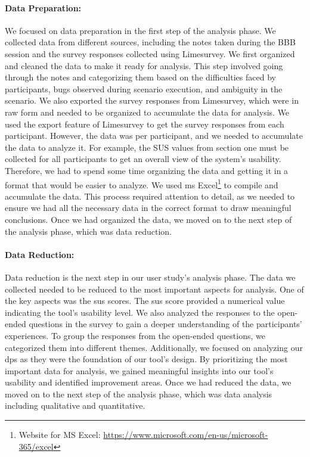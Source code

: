 \paragraph{Data Preparation:}
We focused on data preparation in the first step of the analysis phase. 
We collected data from different sources, including the notes taken during the BBB session and the survey responses collected using Limesurvey. 
We first organized and cleaned the data to make it ready for analysis. 
This step involved going through the notes and categorizing them based on the difficulties faced by participants, bugs observed during scenario execution, and ambiguity in the scenario. 
We also exported the survey responses from Limesurvey, which were in raw form and needed to be organized to accumulate the data for analysis.
We used the export feature of Limesurvey to get the survey responses from each participant. 
However, the data was per participant, and we needed to accumulate the data to analyze it. 
For example, the SUS values from section one must be collected for all participants to get an overall view of the system's usability. 
Therefore, we had to spend some time organizing the data and getting it in a format that would be easier to analyze. 
We used \ac{ms} Excel\footnote{Website for MS Excel: \url{https://www.microsoft.com/en-us/microsoft-365/excel}} to compile and accumulate the data. 
This process required attention to detail, as we needed to ensure we had all the necessary data in the correct format to draw meaningful conclusions. 
Once we had organized the data, we moved on to the next step of the analysis phase, which was data reduction.

\paragraph{Data Reduction:}
Data reduction is the next step in our user study's analysis phase. 
The data we collected needed to be reduced to the most important aspects for analysis. 
One of the key aspects was the \ac{sus} scores. 
The \ac{sus} score provided a numerical value indicating the tool's usability level. 
We also analyzed the responses to the open-ended questions in the survey to gain a deeper understanding of the participants' experiences. To group the responses from the open-ended questions, we categorized them into different themes. 
Additionally, we focused on analyzing our \ac{dp}s as they were the foundation of our tool's design. 
By prioritizing the most important data for analysis, we gained meaningful insights into our tool's usability and identified improvement areas.
Once we had reduced the data, we moved on to the next step of the analysis phase, which was data analysis including qualitative and quantitative.

